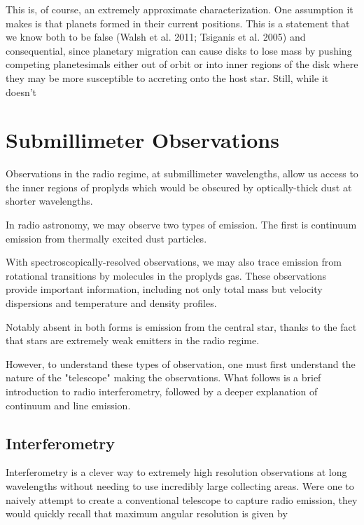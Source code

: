 This is, of course, an extremely approximate characterization. One assumption it makes is that planets formed in their current positions. This is a statement that we know both to be false (Walsh et al. 2011; Tsiganis et al. 2005) and consequential, since planetary migration can cause disks to lose mass by pushing competing planetesimals either out of orbit or into inner regions of the disk where they may be more susceptible to accreting onto the host star. Still, while it doesn't





\section{Submillimeter Observations}

Observations in the radio regime, at submillimeter wavelengths, allow us access to the inner regions of proplyds which would be obscured by optically-thick dust at shorter wavelengths.

In radio astronomy, we may observe two types of emission. The first is continuum emission from thermally excited dust particles.

With spectroscopically-resolved observations, we may also trace emission from rotational transitions by molecules in the proplyds gas. These observations provide important information, including not only total mass but velocity dispersions and  temperature and density profiles.

Notably absent in both forms is emission from the central star, thanks to the fact that stars are extremely weak emitters in the radio regime.

However, to understand these types of observation, one must first understand the nature of the "telescope" making the observations. What follows is a brief introduction to radio interferometry, followed by a deeper explanation of continuum and line emission.



\subsection{Interferometry}
Interferometry is a clever way to extremely high resolution observations at long wavelengths without needing to use incredibly large collecting areas. Were one to naively attempt to create a conventional telescope to capture radio emission, they would quickly recall that maximum angular resolution is given by

